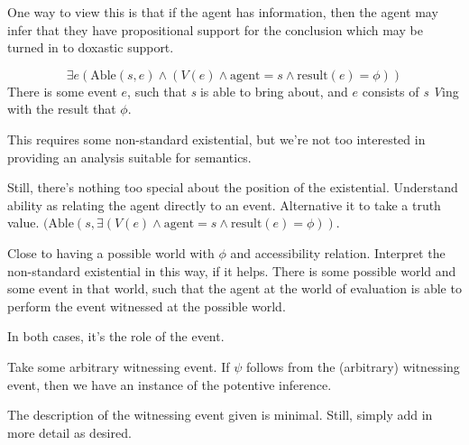 \documentclass[10pt]{article}
\begin{document}
\begin{note}
  One way to view this is that if the agent has information, then the agent may infer that they have propositional support for the conclusion which may be turned in to doxastic support.
\end{note}

\begin{note}
  \[\exists e(\text{Able}(s,e) \land (V(e) \land \text{agent} = s \land \text{result}(e) = \phi))\]
  There is some event \(e\), such that \emph{s} is able to bring about, and \(e\) consists of \emph{s} \emph{V}ing with the result that \(\phi\).

  This requires some non-standard existential, but we're not too interested in providing an analysis suitable for semantics.

  Still, there's nothing too special about the position of the existential.
  Understand ability as relating the agent directly to an event.
  Alternative it to take a truth value.
  \((\text{Able}(s,\exists (V(e) \land \text{agent} = s \land \text{result}(e) = \phi))\).

  Close to having a possible world with \(\phi\) and accessibility relation.
  Interpret the non-standard existential in this way, if it helps.
  There is some possible world and some event in that world, such that the agent at the world of evaluation is able to perform the event witnessed at the possible world.

  In both cases, it's the role of the event.


  Take some arbitrary witnessing event.
  If \(\psi\) follows from the (arbitrary) witnessing event, then we have an instance of the potentive inference.
\end{note}

\begin{note}
  The description of the witnessing event given is minimal.
  Still, simply add in more detail as desired.
\end{note}
\end{document}
